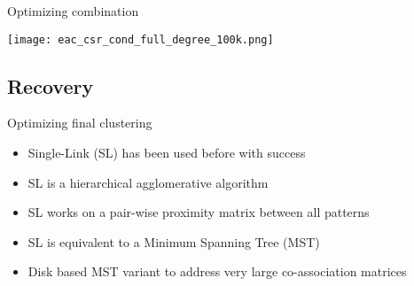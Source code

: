 

\begin{frame}{Optimizing combination}
\begin{center}
  \texttt{[image: eac\_csr\_cond\_full\_degree\_100k.png]}
\end{center}
\end{frame}


\subsection{Recovery}

\begin{frame}{Optimizing final clustering}

\begin{itemize}

\item Single-Link (SL) has been used before with success

\item SL is a hierarchical agglomerative algorithm

\item SL works on a pair-wise proximity matrix between all patterns

\item SL is equivalent to a Minimum Spanning Tree (MST)

\item Disk based MST variant to address very large co-association matrices

\end{itemize}

\end{frame}